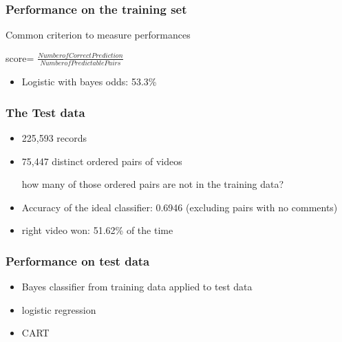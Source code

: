 \documentclass[fleqn]{beamer}
\begin{document}

\begin{frame}
\frametitle{Performance on the training set}

    \begin{beamerboxesrounded}{Common criterion to measure performances}

     score= $\frac{Number of Correct Prediction}{Number of Predictable Pairs}$
     \end{beamerboxesrounded}
    \begin{itemize}
          \item Logistic with bayes odds: 53.3\%
    \end{itemize}
\end{frame}

\begin{frame}
\frametitle{The Test data}
    \begin{itemize}
        \item 225,593 records
        \item 75,447 distinct ordered pairs of videos
        \item [how many of those ordered pairs are not in the training data?]
        \item Accuracy of the ideal classifier: 0.6946 (excluding pairs with no comments)
        \item right video won: 51.62\% of the time
    \end{itemize}

\end{frame}

\begin{frame}
\frametitle{Performance on test data}
    \begin{itemize}
        \item Bayes classifier from training data applied to test data
        \item logistic regression
        \item CART
    \end{itemize}

\end{frame}
\end{document}
